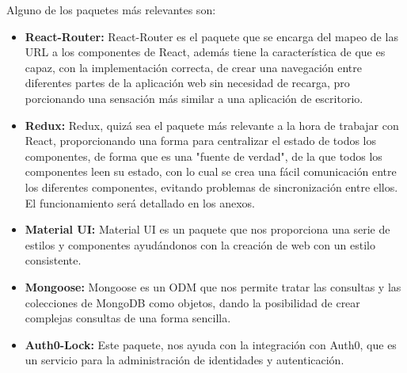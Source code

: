 Alguno de los paquetes más relevantes son:
\begin{itemize}
  \item \textbf{React-Router:} React-Router es el paquete que se encarga del mapeo de las URL a los componentes de React, además tiene la característica de que es capaz, con la implementación correcta, de crear una navegación entre diferentes partes de la aplicación web sin necesidad de recarga, pro
porcionando una sensación más similar a una aplicación de escritorio.

  \item \textbf{Redux:} Redux, quizá sea el paquete más relevante a la hora de trabajar con React, proporcionando una forma para centralizar el estado de todos los componentes, de forma que es una "fuente de verdad", de la que todos los componentes leen su estado, con lo cual se crea una fácil comunicación entre los diferentes componentes, evitando problemas de sincronización entre ellos. El funcionamiento será detallado en los anexos.
  
  \item \textbf{Material UI:} Material UI es un paquete que nos proporciona una serie de estilos y componentes ayudándonos con la creación de web con un estilo consistente.
  
  \item \textbf{Mongoose:} Mongoose es un ODM que nos permite tratar las consultas y las colecciones de MongoDB como objetos, dando la posibilidad de crear complejas consultas de una forma sencilla.
  
  \item \textbf{Auth0-Lock:} Este paquete, nos ayuda con la integración con Auth0, que es un servicio para la administración de identidades y autenticación.
  
\end{itemize}
